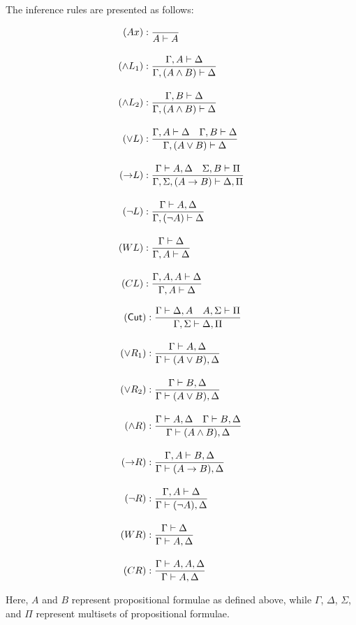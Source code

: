 \begin{definition}
    The inference rules are presented as follows:
    \vspace{-11pt}
    \begin{center}
        \derivationfont
        \begin{minipage}{.4\textwidth}
            \begin{align*}
                (Ax) &: \frac{}{A \vdash A} \\[1em]
                (\land L_1) &: \frac{\Gamma, A \vdash \Delta}{\Gamma, (A \land B) \vdash \Delta} \\[1em]
                (\land L_2) &: \frac{\Gamma, B \vdash \Delta}{\Gamma, (A \land B) \vdash \Delta} \\[1em]
                (\lor L) &: \frac{\Gamma, A \vdash \Delta \quad \Gamma, B \vdash \Delta}{\Gamma, (A \lor B) \vdash \Delta} \\[1em]
                (\mathord{\to} L) &: \frac{\Gamma \vdash A, \Delta \quad \Sigma, B \vdash \Pi}{\Gamma, \Sigma, (A \to B) \vdash \Delta, \Pi} \\[1em]
                (\lnot L) &: \frac{\Gamma \vdash A, \Delta}{\Gamma, (\lnot A) \vdash \Delta} \\[1em]
                (WL) &: \frac{\Gamma \vdash \Delta}{\Gamma, A \vdash \Delta} \\[1em]
                (CL) &: \frac{\Gamma, A, A \vdash \Delta}{\Gamma, A \vdash \Delta}
            \end{align*}
        \end{minipage}%
        \begin{minipage}{.4\textwidth}
            \begin{align*}
                (\textsf{Cut}) &: \frac{\Gamma \vdash \Delta, A \quad A, \Sigma \vdash \Pi}{\Gamma, \Sigma \vdash \Delta, \Pi} \\[1em]
                (\lor R_1) &: \frac{\Gamma \vdash A, \Delta}{\Gamma \vdash (A \lor B), \Delta} \\[1em]
                (\lor R_2) &: \frac{\Gamma \vdash B, \Delta}{\Gamma \vdash (A \lor B), \Delta} \\[1em]
                (\land R) &: \frac{\Gamma \vdash A, \Delta \quad \Gamma \vdash B, \Delta}{\Gamma \vdash (A \land B), \Delta} \\[1em]
                (\mathord{\to} R) &: \frac{\Gamma, A \vdash B, \Delta}{\Gamma \vdash (A \to B), \Delta} \\[1em]
                (\lnot R) &: \frac{\Gamma, A \vdash \Delta}{\Gamma \vdash (\lnot A), \Delta} \\[1em]
                (WR) &: \frac{\Gamma \vdash \Delta}{\Gamma \vdash A, \Delta} \\[1em]
                (CR) &: \frac{\Gamma \vdash A, A, \Delta}{\Gamma \vdash A, \Delta}
            \end{align*}
        \end{minipage}
    \end{center}
    Here, $A$ and $B$ represent propositional formulae as defined above, while $\Gamma$, $\Delta$, $\Sigma$, and $\Pi$ represent multisets of propositional formulae.
\end{definition}
